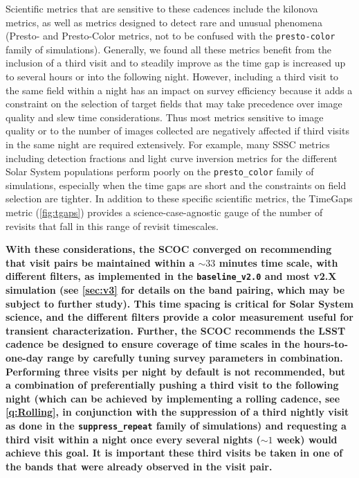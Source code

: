 Scientific metrics that are sensitive to these cadences include the kilonova metrics, as well as metrics designed to detect rare and unusual phenomena (Presto- and Presto-Color metrics, not to be confused with the \texttt{presto-color} family of simulations). Generally, we found all these metrics benefit from the inclusion of a third visit and to steadily improve as the time gap is increased up to several hours or into the following night. However, including a third visit to the same field within a night has an impact on survey efficiency because it adds a constraint on the selection of target fields that may take precedence over image quality and slew time considerations. Thus most metrics sensitive to image quality or to the number of images collected are negatively affected if third visits in the same night are required extensively. For example, many SSSC metrics including detection fractions and light curve inversion metrics for the different Solar System populations
 perform poorly on the \texttt{presto\_color} family of simulations, especially when the time gaps are short and the constraints on field selection are tighter. In addition to these specific scientific metrics, the TimeGaps metric (\autoref{fig:tgaps}) provides a science-case-agnostic gauge of the number of revisits that fall in this range of revisit timescales.


{\bf With these considerations, the SCOC converged on recommending that visit pairs be maintained within a $\sim33$ minutes time scale, with different filters, as implemented in the \texttt{baseline\_v2.0} and most v2.X simulation (see \autoref{sec:v3} for details on the band pairing, which may be subject to further study).
This time spacing is critical for Solar System science, and the different filters provide a color measurement useful for transient characterization. Further, the SCOC recommends the LSST cadence be designed to ensure coverage of time scales in the hours-to-one-day range by carefully tuning survey parameters in combination. Performing three visits per night by default is not recommended, but a combination of preferentially pushing a third visit to the following night (which can be achieved by implementing a rolling cadence, see \autoref{q:Rolling}, in conjunction with the suppression of a third nightly visit as done in the \texttt{suppress\_repeat} family of simulations) and requesting a third visit within a night once every several nights ($\sim1$ week) would achieve this goal.
It is important these third visits be taken in one of the bands that were already observed in the visit pair.}

